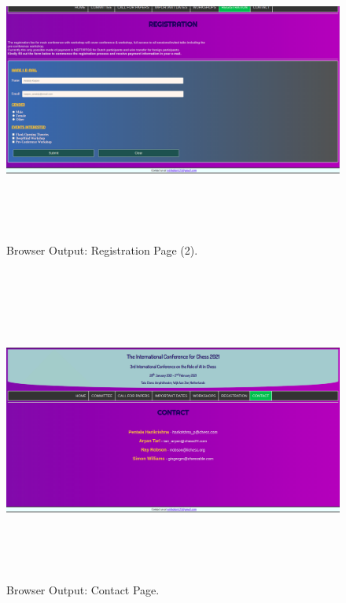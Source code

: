 \documentclass[12pt, a4]{article}
\begin{document}
\newpage
\begin{figure}[h]
\centering
\caption{Browser Output: Registration Page (2).}
\includegraphics[height=10cm, width=18cm, keepaspectratio]{Output/Reg-2.png}
\end{figure}

\newpage
\subsection*{}
\begin{figure}[h]
\centering
\caption{Browser Output: Contact Page.}
\includegraphics[height=10cm, width=18cm, keepaspectratio]{Output/Contact.png}
\end{figure}
\end{document}
